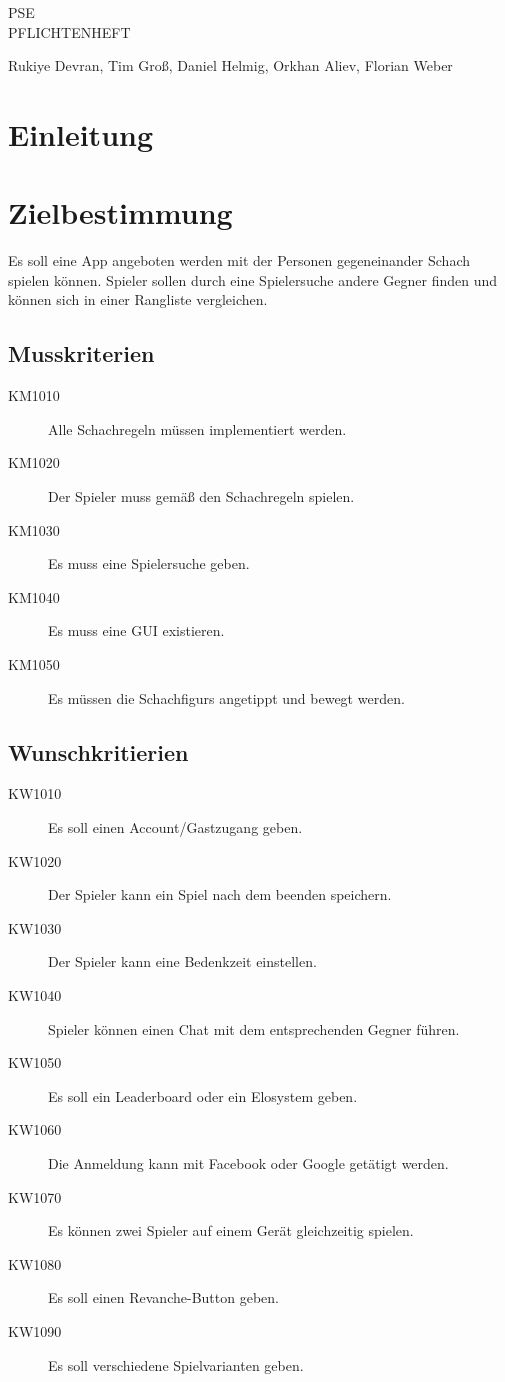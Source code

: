 \documentclass[parskip=full]{scrartcl}
\begin{document}
	\begin{titlepage}
		\centering
		\vspace*{0.2\textheight}
		{\Large PSE}\\[\baselineskip]
		{\Huge PFLICHTENHEFT}\\[\baselineskip]\par
		{\LARGE Rukiye Devran, Tim Groß, Daniel Helmig, Orkhan Aliev, Florian Weber}\par
	
	\newpage	
	\tableofcontents
	\pagebreak
	
	\end{titlepage}
\section{Einleitung}
\section{Zielbestimmung}
Es soll eine App angeboten werden mit der Personen gegeneinander \gls{Schach} spielen können. \gls{Spieler} sollen durch eine Spielersuche andere Gegner finden und können sich in einer Rangliste vergleichen. 
\subsection{Musskriterien}
\begin{description}
\item[KM1010] Alle \gls{Schachregeln} müssen implementiert werden.
\item[KM1020] Der \gls{Spieler} muss gemäß den \gls{Schachregeln} spielen.
\item[KM1030] Es muss eine Spielersuche geben.
\item[KM1040] Es muss eine \gls{GUI} existieren.
\item[KM1050] Es müssen die \glspl{Schachfigur} angetippt und bewegt werden.
\end{description}

\subsection{Wunschkritierien}
\begin{description}
\item[KW1010] Es soll einen Account/Gastzugang geben.
\item[KW1020] Der \gls{Spieler} kann ein Spiel nach dem beenden speichern.
\item[KW1030] Der \gls{Spieler} kann eine Bedenkzeit einstellen.
\item[KW1040] \gls{Spieler} können einen Chat mit dem entsprechenden Gegner führen.
\item[KW1050] Es soll ein Leaderboard oder ein \gls{Elo}system geben.
\item[KW1060] Die Anmeldung kann mit Facebook oder Google getätigt werden.
\item[KW1070] Es können zwei \gls{Spieler} auf einem Gerät gleichzeitig spielen.
\item[KW1080] Es soll einen Revanche-Button geben.
\item[KW1090] Es soll verschiedene Spielvarianten geben.
\end{description}
\end{document}
